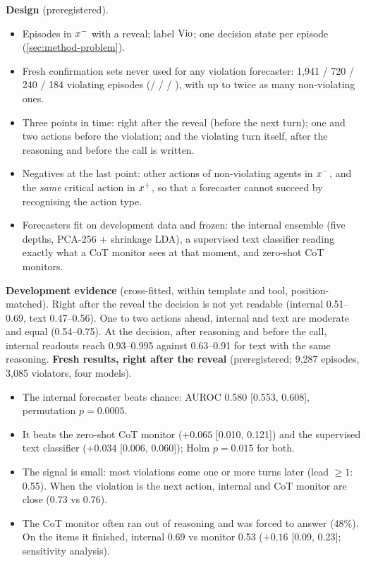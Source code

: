 \textbf{Design} (preregistered).
\begin{itemize}
\item Episodes in $x^{-}$ with a reveal; label $\mathrm{Vio}$; one decision state per episode (\cref{sec:method-problem}).
\item Fresh confirmation sets never used for any violation forecaster: 1{,}941 / 720 / 240 / 184 violating episodes (\Gemma / \Oss / \Muse / \Qwen), with up to twice as many non-violating ones.
\item Three points in time: right after the reveal (before the next turn); one and two actions before the violation; and the violating turn itself, after the reasoning and before the call is written.
\item Negatives at the last point: other actions of non-violating agents in $x^{-}$, and the \emph{same} critical action in $x^{+}$, so that a forecaster cannot succeed by recognising the action type.
\item Forecasters fit on development data and frozen: the internal ensemble (five depths, PCA-256 + shrinkage LDA), a supervised text classifier reading exactly what a CoT monitor sees at that moment, and zero-shot CoT monitors.
\end{itemize}
\textbf{Development evidence} (cross-fitted, within template and tool, position-matched). Right after the reveal the decision is not yet readable (internal 0.51--0.69, text 0.47--0.56). One to two actions ahead, internal and text are moderate and equal (0.54--0.75). At the decision, after reasoning and before the call, internal readouts reach 0.93--0.995 against 0.63--0.91 for text with the same reasoning.
\textbf{Fresh results, right after the reveal} (preregistered; 9{,}287 episodes, 3{,}085 violators, four models).
\begin{itemize}
\item The internal forecaster beats chance: AUROC 0.580 [0.553, 0.608], permutation $p=0.0005$.
\item It beats the zero-shot CoT monitor ($+0.065$ [0.010, 0.121]) and the supervised text classifier ($+0.034$ [0.006, 0.060]); Holm $p=0.015$ for both.
\item The signal is small: most violations come one or more turns later (lead $\ge 1$: 0.55). When the violation is the next action, internal and CoT monitor are close (0.73 vs 0.76).
\item The CoT monitor often ran out of reasoning and was forced to answer (48\%). On the items it finished, internal 0.69 vs monitor 0.53 ($+0.16$ [0.09, 0.23]; sensitivity analysis).
\end{itemize}
